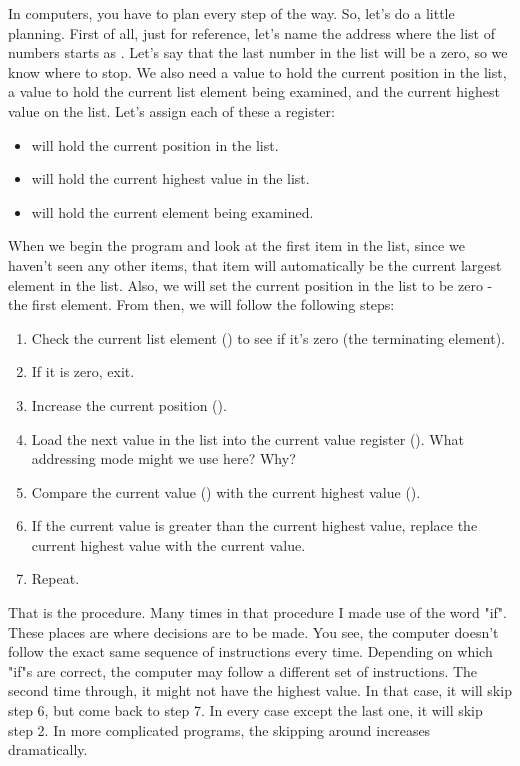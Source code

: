 In computers, you have to plan every step of the way.  So, let's do
a little planning.  First of all, just for reference, let's name the
address where the list of numbers starts as .
Let's say that the last number in the list will be a zero, so we know where
to stop.  We also need a value to hold the current position in the list,
a value to hold the current list element being examined, and the current
highest value on the list.  Let's assign each of these a register:

\begin{itemize}\item {\ediReg} will hold the current position in the list. 
\item {\ebxReg} will hold the current highest value in the list. 
\item {\eaxReg} will hold the current element being examined. 
\end{itemize}

When we begin the program and look at the first item in the list, since we
haven't seen any other items, that item will automatically be the current
largest element in the list.  Also, we will set the current position in the
list to be zero - the first element.  From then, we will follow the following
steps:

\begin{enumerate}\item Check the current list element ({\eaxReg}) to see if it's zero (the terminating element). 
\item If it is zero, exit. 
\item Increase the current position ({\ediReg}). 
\item Load the next value in the list into the current value register ({\eaxReg}).  What addressing mode might we use here?  Why? 
\item Compare the current value ({\eaxReg}) with the current highest value ({\ebxReg}). 
\item If the current value is greater than the current highest value, replace the current highest value with the current value. 
\item Repeat. 
\end{enumerate}

That is the procedure.  Many times in that procedure I made use of the word
"if".  These places are where decisions are to be made.  You see, the computer
doesn't follow the exact same sequence of instructions every time.  Depending
on which "if"s are correct, the computer may follow a different set of 
instructions.  The second time through, it might not have the highest value.
In that case, it will skip step 6, but come back to step 7.  In every 
case except the last one, it will skip step 2.  In more complicated programs,
the skipping around increases dramatically.


